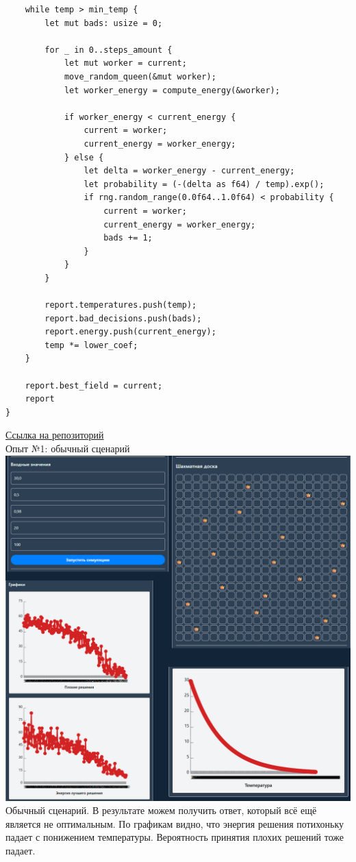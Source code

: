 \documentclass[a4paper,14pt]{extarticle}
\begin{document}
\begin{verbatim}
    while temp > min_temp {
        let mut bads: usize = 0;

        for _ in 0..steps_amount {
            let mut worker = current;
            move_random_queen(&mut worker);
            let worker_energy = compute_energy(&worker);

            if worker_energy < current_energy {
                current = worker;
                current_energy = worker_energy;
            } else {
                let delta = worker_energy - current_energy;
                let probability = (-(delta as f64) / temp).exp();
                if rng.random_range(0.0f64..1.0f64) < probability {
                    current = worker;
                    current_energy = worker_energy;
                    bads += 1;
                }
            }
        }

        report.temperatures.push(temp);
        report.bad_decisions.push(bads);
        report.energy.push(current_energy);
        temp *= lower_coef;
    }

    report.best_field = current;
    report
}
\end{verbatim}

\href{https://github.com/IAmProgrammist/ai_basics/tree/lab1}{Ссылка на репозиторий}\\

Опыт №1: обычный сценарий\\
\includegraphics[width=140mm]{report1}\\
Обычный сценарий. В результате можем получить ответ, который всё ещё является не оптимальным. По графикам видно, что 
энергия решения потихоньку падает с понижением температуры. Вероятность принятия плохих решений тоже падает.\bigbreak
\end{document}

